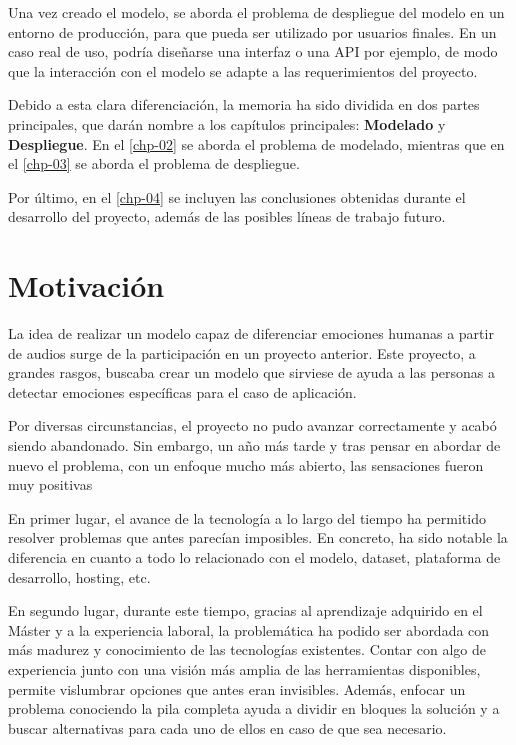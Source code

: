 Una vez creado el modelo, se aborda el problema de despliegue del modelo en un entorno de producción, para que pueda ser utilizado por usuarios finales.
En un caso real de uso, podría diseñarse una interfaz o una API por ejemplo, de modo que la interacción con el modelo se adapte a las requerimientos del proyecto.

\medskip

Debido a esta clara diferenciación, la memoria ha sido dividida en dos partes principales, que darán nombre a los capítulos principales: \textbf{Modelado} y \textbf{Despliegue}.
En el \autoref{chp-02} se aborda el problema de modelado, mientras que en el \autoref{chp-03} se aborda el problema de despliegue.

Por último, en el \autoref{chp-04} se incluyen las conclusiones obtenidas durante el desarrollo del proyecto, además de las posibles líneas de trabajo futuro.

\section{Motivación}\label{sec:motivacion}

La idea de realizar un modelo capaz de diferenciar emociones humanas a partir de audios surge de la participación en un proyecto anterior.
Este proyecto, a grandes rasgos, buscaba crear un modelo que sirviese de ayuda a las personas a detectar emociones específicas para el caso de aplicación.

Por diversas circunstancias, el proyecto no pudo avanzar correctamente y acabó siendo abandonado.
Sin embargo, un año más tarde y tras pensar en abordar de nuevo el problema, con un enfoque mucho más abierto, las sensaciones fueron muy positivas

En primer lugar, el avance de la tecnología a lo largo del tiempo ha permitido resolver problemas que antes parecían imposibles.
En concreto, ha sido notable la diferencia en cuanto a todo lo relacionado con el modelo, dataset, plataforma de desarrollo, hosting, etc.

En segundo lugar, durante este tiempo, gracias al aprendizaje adquirido en el Máster y a la experiencia laboral, la problemática ha podido ser abordada con más madurez y conocimiento de las tecnologías existentes.
Contar con algo de experiencia junto con una visión más amplia de las herramientas disponibles, permite vislumbrar opciones que antes eran invisibles.
Además, enfocar un problema conociendo la pila completa ayuda a dividir en bloques la solución y a buscar alternativas para cada uno de ellos en caso de que sea necesario.

